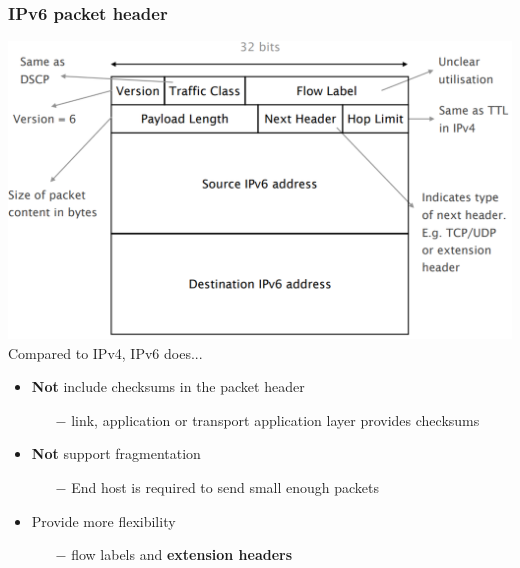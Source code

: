 \documentclass[a4paper, fontsize=8pt, landscape, DIV=1]{scrartcl}
\begin{document}
\begin{multicols*}{4}
		\subsubsection{IPv6 packet header}
		\includegraphics[width=\columnwidth]{images/Network_Layer/v6_header.png}
		Compared to IPv4, IPv6 does...
		\begin{itemize}[noitemsep]
			\item \textbf{Not} include checksums in the packet header
			\begin{itemize}
				\item[$-$] link, application or transport application layer provides
				checksums
			\end{itemize}
			\item \textbf{Not} support fragmentation
			\begin{itemize}
				\item[$-$] End host is required to send small enough packets
			\end{itemize}
			\item Provide more flexibility
			\begin{itemize}
				\item[$-$] flow labels and \textbf{extension headers}
			\end{itemize}
		\end{itemize}
		\newpage 
		

\end{multicols*}
\end{document}
